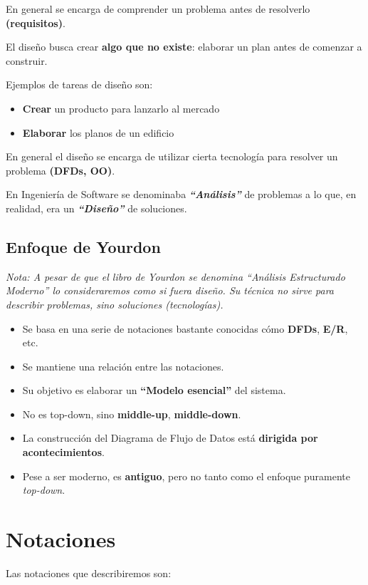 En general se encarga de comprender un problema antes de resolverlo \textbf{(requisitos)}.

El diseño busca crear \textbf{algo que no existe}: elaborar un plan antes de comenzar a construir.

Ejemplos de tareas de diseño son:

\begin{itemize}[noitemsep]
\item \textbf{Crear} un producto para lanzarlo al mercado
\item \textbf{Elaborar} los planos de un edificio
\end{itemize}

En general el diseño se encarga de utilizar cierta tecnología para resolver un problema \textbf{(DFDs, OO)}.

En Ingeniería de Software se denominaba \textit{\textbf{``Análisis''}} de problemas a lo que, en realidad, era un \textit{\textbf{``Diseño''}} de soluciones.

\subsection{Enfoque de Yourdon}
\textit{Nota: A pesar de que el libro de Yourdon se denomina ``Análisis Estructurado Moderno'' lo consideraremos como si fuera diseño. Su técnica no sirve para describir problemas, sino soluciones (tecnologías).}

\begin{itemize}[noitemsep]
\item Se basa en una serie de notaciones bastante conocidas cómo \textbf{DFDs}, \textbf{E/R}, etc.
\item Se mantiene una relación entre las notaciones.
\item Su objetivo es elaborar un \textbf{``Modelo esencial''} del sistema.
\item No es top-down, sino \textbf{middle-up}, \textbf{middle-down}.
\item La construcción del Diagrama de Flujo de Datos está \textbf{dirigida por acontecimientos}.
\item Pese a ser moderno, es \textbf{antiguo}, pero no tanto como el enfoque puramente \textit{top-down}.
\end{itemize}

\section{Notaciones}
Las notaciones que describiremos son:

